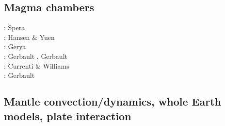 \subsection{Magma chambers}

\begin{scriptsize}
\nineteeneightytwo: Spera \etal \cite{spyk82}\\
\nineteeneightyseven: Hansen \& Yuen \cite{hayu87}\\
\twothousandfour: Gerya \etal \cite{geys04}\\
\twothousandtwelve: Gerbault \cite{gerb12}, Gerbault \etal \cite{gech12}\\
\twothousandfourteen: Currenti \& Williams \cite{cuwi14}\\
\twothousandeighteen: Gerbault \etal \cite{gehn18}
\end{scriptsize}

\subsection{Mantle convection/dynamics, whole Earth models, plate interaction}

